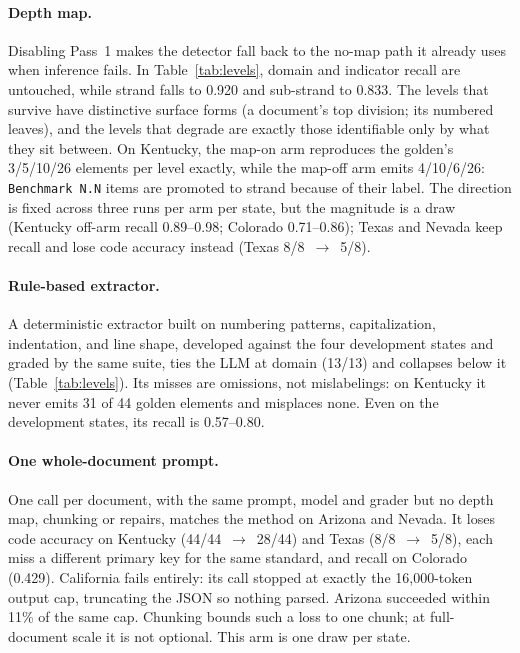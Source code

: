 \documentclass[letterpaper]{article} %
\begin{document}


\paragraph{Depth map.} Disabling Pass~1 makes the detector fall back to the
no-map path it already uses when inference fails. In Table~\ref{tab:levels},
domain and indicator recall are untouched, while strand falls to 0.920 and
sub-strand to 0.833. The levels that survive have distinctive surface forms (a
document's top division; its numbered leaves), and the levels that degrade are
exactly those identifiable only by what they sit between. On Kentucky, the
map-on arm reproduces the golden's 3/5/10/26 elements per level exactly, while
the map-off arm emits 4/10/6/26: \texttt{Benchmark N.N} items are promoted to
strand because of their label. The direction is fixed across three runs per
arm per state, but the magnitude is a draw (Kentucky off-arm recall
0.89--0.98; Colorado 0.71--0.86); Texas and Nevada keep recall and lose code
accuracy instead (Texas 8/8~$\rightarrow$~5/8).

\paragraph{Rule-based extractor.} A deterministic extractor built on
numbering patterns, capitalization, indentation, and line shape, developed
against the four development states and graded by the same suite, ties the
LLM at domain (13/13) and collapses below it (Table~\ref{tab:levels}). Its
misses are omissions, not mislabelings: on Kentucky it never emits 31 of 44
golden elements and misplaces none. Even on the development states, its recall
is 0.57--0.80.

\paragraph{One whole-document prompt.} One call per document, with the same
prompt, model and grader but no depth map, chunking or repairs, matches the
method on Arizona and Nevada. It loses code accuracy on Kentucky
(44/44~$\rightarrow$~28/44) and Texas (8/8~$\rightarrow$~5/8), each miss a
different primary key for the same standard, and recall on Colorado (0.429).
California fails entirely: its call stopped at exactly the 16{,}000-token
output cap, truncating the JSON so nothing parsed. Arizona succeeded within
11\% of the same cap. Chunking bounds such a loss to one chunk; at
full-document scale it is not optional. This arm is one draw per state.
\end{document}

